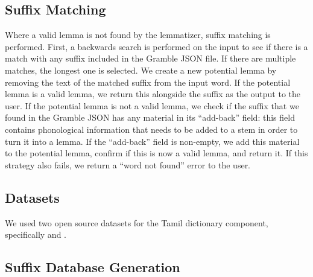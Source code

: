 \documentclass[11pt]{article}
\begin{document}
\subsection{Suffix Matching}
Where a valid lemma is not found by the lemmatizer, 
suffix matching is performed. First, a backwards search is 
performed on the input to see if there is a match with any
suffix included in the Gramble JSON file. If there are multiple matches, 
the longest one is selected. We create a new potential lemma by 
removing the text of the matched suffix from the input word. 
If the potential lemma is a valid lemma, we return this alongside the 
suffix as the output to the user. If the potential lemma is not a valid lemma, 
we check if the suffix that we found in the Gramble JSON has any 
material in its “add-back” field: this field contains phonological 
information that needs to be added to a stem in order to turn it into a lemma. 
If the “add-back” field is non-empty, we add this material to the potential lemma, 
confirm if this is now a valid lemma, and return it. If this strategy also fails, 
we return a “word not found” error to the user.

\subsection{Datasets}
We used two open source datasets for the Tamil dictionary component, specifically 
\citet{ylonen_wiktextract_2022} and \citet{vasuki_dharma_nodate}.

\subsection{Suffix Database Generation}
\end{document}
